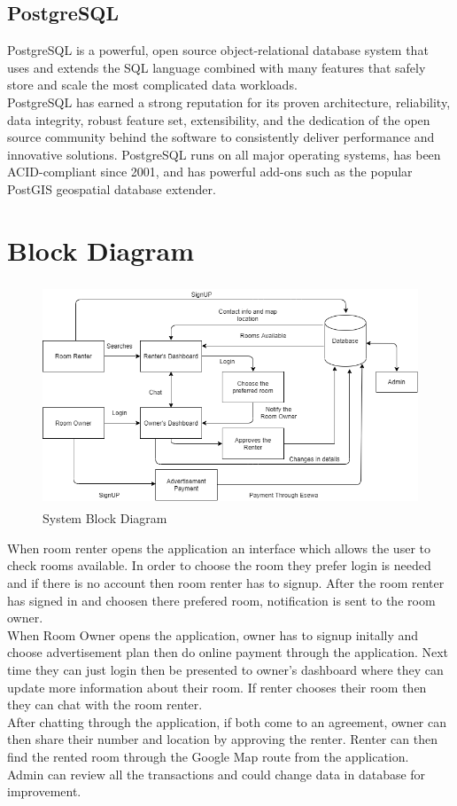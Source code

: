\subsection{PostgreSQL}
PostgreSQL is a powerful, open source object-relational database system that uses and extends the SQL language combined with many features that safely store and scale the most complicated data workloads.\\
PostgreSQL has earned a strong reputation for its proven architecture, reliability, data integrity, robust feature set, extensibility, and the dedication of the open source community behind the software to consistently deliver performance and innovative solutions. PostgreSQL runs on all major operating systems, has been ACID-compliant since 2001, and has powerful add-ons such as the popular PostGIS geospatial database extender.\\
\section{Block Diagram}
\begin{figure}[ht]
	\centering
	\includegraphics[width=\linewidth, height=250px]{Graphics/diagram.png}
	\caption{System Block Diagram }
\end{figure}
When room renter opens the application an interface which allows the user to check rooms available. In order to choose the room they prefer login is needed and if there is no account then room renter has to signup. After the room renter has signed in and choosen there prefered room, notification is sent to the room owner. \\
When Room Owner opens the application, owner has to signup initally and choose advertisement plan then do online payment through the application. Next time they can just login then be presented to owner's dashboard where they can update more information about their room. If renter chooses their room then they can chat with the room renter.\\
After chatting through the application, if both come to an agreement, owner can then share their number and location by approving the renter. Renter can then find the rented room through the Google Map route from the application.\\
Admin can review all the transactions and could change data in database for improvement.\\
